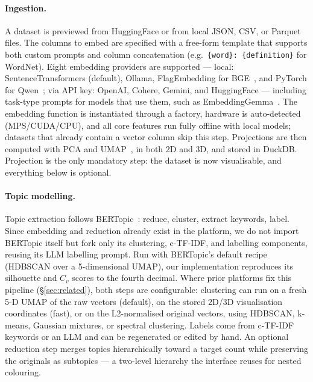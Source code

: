 \paragraph{Ingestion.}
A dataset is previewed from HuggingFace or from local JSON, CSV, or Parquet files. The columns to embed are specified with a free-form template that supports both custom prompts and column concatenation (e.g.\ \texttt{\{word\}: \{definition\}} for WordNet). Eight embedding providers are supported --- local: SentenceTransformers (default), Ollama, FlagEmbedding for BGE~\cite{chen-etal-2024-m3}, and PyTorch for Qwen~\cite{zhang2025qwen3embeddingadvancingtext}; via API key: OpenAI, Cohere, Gemini, and HuggingFace --- including task-type prompts for models that use them, such as EmbeddingGemma~\cite{vera2025embeddinggemmapowerfullightweighttext}. The embedding function is instantiated through a factory, hardware is auto-detected (MPS/CUDA/CPU), and all core features run fully offline with local models; datasets that already contain a vector column skip this step. Projections are then computed with PCA and UMAP~\cite{McInnes2018}, in both 2D and 3D, and stored in DuckDB. Projection is the only mandatory step: the dataset is now visualisable, and everything below is optional.

\paragraph{Topic modelling.}
Topic extraction follows BERTopic~\cite{grootendorst2022bertopicneuraltopicmodeling}: reduce, cluster, extract keywords, label. Since embedding and reduction already exist in the platform, we do not import BERTopic itself but fork only its clustering, c-TF-IDF, and labelling components, reusing its LLM labelling prompt. Run with BERTopic's default recipe (HDBSCAN over a 5-dimensional UMAP), our implementation reproduces its silhouette and $C_v$ scores to the fourth decimal. Where prior platforms fix this pipeline (\S\ref{sec:related}), both steps are configurable: clustering can run on a fresh 5-D UMAP of the raw vectors (default), on the stored 2D/3D visualisation coordinates (fast), or on the L2-normalised original vectors, using HDBSCAN, k-means, Gaussian mixtures, or spectral clustering. Labels come from c-TF-IDF keywords or an LLM and can be regenerated or edited by hand. An optional reduction step merges topics hierarchically toward a target count while preserving the originals as subtopics --- a two-level hierarchy the interface reuses for nested colouring.


